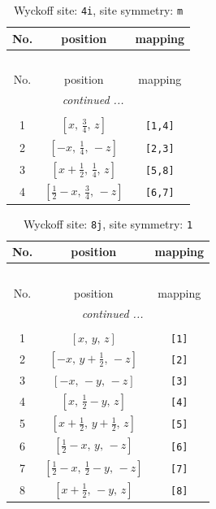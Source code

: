 \documentclass[fleqn,8pt]{jsarticle}
\begin{document}
\renewcommand{\arraystretch}{1.2}
\begin{longtable}{ccc}
\caption{Wyckoff site: {\tt 4i}, site symmetry: {\tt m}}
 \\
 \hline \hline
No. & position & mapping \\ \hline \endfirsthead

\multicolumn{2}{l}{\tablename\ \thetable{}} \\
 \hline \hline
No. & position & mapping \\ \hline \endhead

 \hline \hline
\multicolumn{2}{r}{\footnotesize\it continued ...} \\ \endfoot

 \hline \hline
\multicolumn{2}{r}{} \\ \endlastfoot

1 & $\left[ x,\, \frac{3}{4},\, z \right]$ & {\tt [1,4]} \\ \hline
2 & $\left[ - x,\, \frac{1}{4},\, - z \right]$ & {\tt [2,3]} \\ \hline
3 & $\left[ x + \frac{1}{2},\, \frac{1}{4},\, z \right]$ & {\tt [5,8]} \\ \hline
4 & $\left[ \frac{1}{2} - x,\, \frac{3}{4},\, - z \right]$ & {\tt [6,7]} \\
\end{longtable}
\renewcommand{\arraystretch}{1.2}
\begin{longtable}{ccc}
\caption{Wyckoff site: {\tt 8j}, site symmetry: {\tt 1}}
 \\
 \hline \hline
No. & position & mapping \\ \hline \endfirsthead

\multicolumn{2}{l}{\tablename\ \thetable{}} \\
 \hline \hline
No. & position & mapping \\ \hline \endhead

 \hline \hline
\multicolumn{2}{r}{\footnotesize\it continued ...} \\ \endfoot

 \hline \hline
\multicolumn{2}{r}{} \\ \endlastfoot

1 & $\left[ x,\, y,\, z \right]$ & {\tt [1]} \\ \hline
2 & $\left[ - x,\, y + \frac{1}{2},\, - z \right]$ & {\tt [2]} \\ \hline
3 & $\left[ - x,\, - y,\, - z \right]$ & {\tt [3]} \\ \hline
4 & $\left[ x,\, \frac{1}{2} - y,\, z \right]$ & {\tt [4]} \\ \hline
5 & $\left[ x + \frac{1}{2},\, y + \frac{1}{2},\, z \right]$ & {\tt [5]} \\ \hline
6 & $\left[ \frac{1}{2} - x,\, y,\, - z \right]$ & {\tt [6]} \\ \hline
7 & $\left[ \frac{1}{2} - x,\, \frac{1}{2} - y,\, - z \right]$ & {\tt [7]} \\ \hline
8 & $\left[ x + \frac{1}{2},\, - y,\, z \right]$ & {\tt [8]} \\
\end{longtable}
\end{document}

